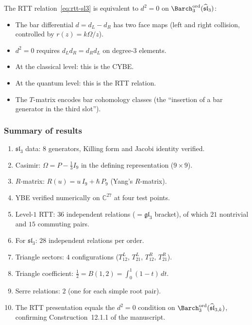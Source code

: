 The RTT relation~\eqref{eq:rtt-sl3} is equivalent to $d^2 = 0$
on $\Barch_3^{\mathrm{ord}}(\widehat{\mathfrak{sl}}_3)$:
\begin{itemize}
\item The bar differential
  $d = d_L - d_R$ has two face maps
  (left and right collision, controlled by $r(z) = k\Omega/z$).
\item $d^2 = 0$ requires $d_L d_R = d_R d_L$ on degree-$3$ elements.
\item At the classical level: this is the CYBE.
\item At the quantum level: this is the RTT relation.
\item The $T$-matrix encodes bar cohomology classes
  (the ``insertion of a bar generator in the third slot'').
\end{itemize}

\subsubsection*{Summary of results}

\begin{enumerate}
\item $\mathfrak{sl}_3$ data: $8$ generators,
  Killing form and Jacobi identity verified.
\item Casimir: $\Omega = P - \frac{1}{3} I_9$
  in the defining representation ($9 \times 9$).
\item $R$-matrix: $R(u) = u\,I_9 + \hbar\,P_9$ (Yang's $R$-matrix).
\item YBE verified numerically on $\mathbb{C}^{27}$ at four test points.
\item Level-$1$ RTT: $36$ independent relations ($= \mathfrak{gl}_3$ bracket),
  of which $21$ nontrivial and $15$ commuting pairs.
\item For $\mathfrak{sl}_3$: $28$ independent relations per order.
\item Triangle sectors: $4$ configurations
  ($T^L_{12}$, $T^L_{21}$, $T^R_{12}$, $T^R_{21}$).
\item Triangle coefficient: $\frac{1}{2} = B(1,2)
  = \int_0^1(1-t)\,dt$.
\item Serre relations: $2$ (one for each simple root pair).
\item The RTT presentation equals the $d^2 = 0$ condition on
  $\Barch_3^{\mathrm{ord}}(\widehat{\mathfrak{sl}}_{3,k})$,
  confirming Construction~12.1.1 of the manuscript.
\end{enumerate}
